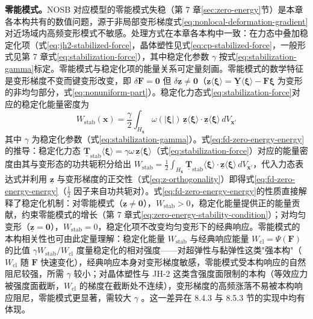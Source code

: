 \textbf{零能模式。}NOSB 对应模型的零能模式失稳（第 7 章\ref{sec:zero-energy}节）是本章各本构共有的数值问题，源于非局部变形梯度式\eqref{eq:nonlocal-deformation-gradient}对近场域内高频变形模式不敏感。处理方式在本章各本构中一致：在力态中叠加稳定化项（式\eqref{eq:jh2-stabilized-force}，晶体塑性见式\eqref{eq:cp-stabilized-force}，一般形式见第 7 章式\eqref{eq:stabilization-force}），其中稳定化参数 $\gamma$ 按式\eqref{eq:stabilization-gamma}标定。零能模式与稳定化项的能量关系可定量刻画。零能模式的数学特征是变形梯度不变而键变形改变，即 $\delta\mathbf{F}=\mathbf{0}$ 但 $\delta\underline{\mathbf{z}}\neq\mathbf{0}$（$\underline{\mathbf{z}}\langle\boldsymbol{\xi}\rangle=\underline{\mathbf{Y}}\langle\boldsymbol{\xi}\rangle-\mathbf{F}\boldsymbol{\xi}$ 为变形的非均匀部分，式\eqref{eq:nonuniform-part}）。稳定化力态式\eqref{eq:stabilization-force}对应的稳定化能量密度为
\begin{equation}
  W_{\mathrm{stab}}(\mathbf{x})
  =\frac{\gamma}{2}\int_{H_{\mathbf{x}}}\omega(|\boldsymbol{\xi}|)\,
  \underline{\mathbf{z}}\langle\boldsymbol{\xi}\rangle\cdot
  \underline{\mathbf{z}}\langle\boldsymbol{\xi}\rangle\,dV_{\mathbf{x}'}
  \label{eq:fd-zero-energy-energy}
\end{equation}
其中 $\gamma$ 为稳定化参数（式\eqref{eq:stabilization-gamma}）。式\eqref{eq:fd-zero-energy-energy}的推导：稳定化力态 $\underline{\mathbf{T}}_{\mathrm{stab}}\langle\boldsymbol{\xi}\rangle=\gamma\omega\,\underline{\mathbf{z}}\langle\boldsymbol{\xi}\rangle$（式\eqref{eq:stabilization-force}）对应的能量密度由其与变形态的功共轭积分给出 $W_{\mathrm{stab}}=\tfrac{1}{2}\int_{H_{\mathbf{x}}}\underline{\mathbf{T}}_{\mathrm{stab}}\langle\boldsymbol{\xi}\rangle\cdot\underline{\mathbf{z}}\langle\boldsymbol{\xi}\rangle\,dV_{\mathbf{x}'}$，代入力态表达式并利用 $\underline{\mathbf{z}}$ 与变形梯度的正交性（式\eqref{eq:z-orthogonality}）即得式\eqref{eq:fd-zero-energy-energy}（$\tfrac{1}{2}$ 因子来自功共轭对）。式\eqref{eq:fd-zero-energy-energy}的性质直接解释了稳定化机制：对零能模式（$\underline{\mathbf{z}}\neq\mathbf{0}$），$W_{\mathrm{stab}}>0$，稳定化能量提供正的能量贡献，约束零能模式的增长（第 7 章式\eqref{eq:zero-energy-stability-condition}）；对均匀变形（$\underline{\mathbf{z}}=\mathbf{0}$），$W_{\mathrm{stab}}=0$，稳定化项不改变均匀变形下的经典响应。零能模式的本构相关性也可由此定量理解：稳定化能量 $W_{\mathrm{stab}}$ 与经典响应能量 $W_{\mathrm{cl}}=\Psi(\mathbf{F})$ 的比值 $\gamma W_{\mathrm{stab}}/W_{\mathrm{cl}}$ 度量稳定化的相对强度——对超弹性与黏弹性这类"强本构"（$W_{\mathrm{cl}}$ 随 $\mathbf{F}$ 快速变化），经典响应本身对变形梯度敏感，零能模式受本构响应的自然阻尼较强，所需 $\gamma$ 较小；对晶体塑性与 JH-2 这类含强度面限制的本构（等效应力被强度面截断，$W_{\mathrm{cl}}$ 的梯度在截断处不连续），变形梯度的高频涨落不易被本构响应阻尼，零能模式更显著，需较大 $\gamma$ \cite{Silling2017,GuZhangMadenciXia2019}。这一差异在 8.4.3 与 8.5.3 节的实现中均有体现。

